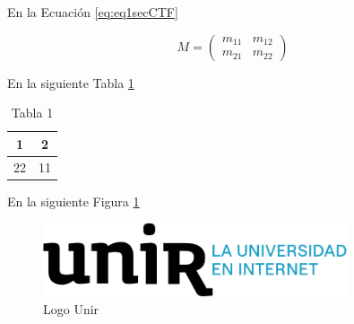 
En la Ecuación \eqref{eq:eq1secCTF}


\begin{equation}\label{eq:eq1secCTF}
M=\begin{pmatrix}
	m_{11}&m_{12}\\
	m_{21}&m_{22}
\end{pmatrix}
\end{equation}

En la siguiente Tabla \ref{tab:tab1secCTF}

\begin{table}[h]
\centering
\begin{tabular}{|c|c|}
	\hline
	1 & 2 \\
	\hline
	22 & 11 \\
	\hline
\end{tabular}
\caption{Tabla 1}
\label{tab:tab1secCTF}
\end{table}

En la siguiente Figura \ref{fig:fig1secCTF}

\begin{figure}[h]
\includegraphics[width= 0.8\textwidth]{logo_unir}
\caption{Logo Unir}
\label{fig:fig1secCTF}
\end{figure}

\cite{PIMENTEL2016744} \cite{da_S_Bessa_2023}
